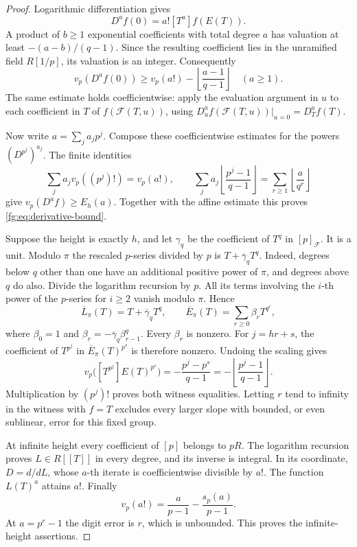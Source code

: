\begin{proof}
Logarithmic differentiation gives
\[
 D^af(0)=a![T^a]f(E(T)).
\]
A product of $b\ge1$ exponential coefficients with total degree $a$
has valuation at least $-(a-b)/(q-1)$. Since the resulting coefficient
lies in the unramified field $R[1/p]$, its valuation is an integer.
Consequently
\[
 v_p(D^af(0))\ge
 v_p(a!)-\left\lfloor\frac{a-1}{q-1}\right\rfloor
 \quad(a\ge1).
\]
The same estimate holds coefficientwise: apply the evaluation argument
in $u$ to each coefficient in $T$ of $f(\mathcal F(T,u))$, using
$D_u^a f(\mathcal F(T,u))|_{u=0}=D_T^af(T)$.

Now write $a=\sum_j a_jp^j$. Compose these coefficientwise estimates
for the powers $(D^{p^j})^{a_j}$. The finite identities
\[
 \sum_j a_jv_p((p^j)!)=v_p(a!),\qquad
 \sum_j a_j\left\lfloor\frac{p^j-1}{q-1}\right\rfloor
       =\sum_{r\ge1}\left\lfloor\frac a{q^r}\right\rfloor
\]
give $v_p(D^af)\ge E_h(a)$. Together with the affine estimate this
proves \eqref{fg:eq:derivative-bound}.

Suppose the height is exactly $h$, and let $\gamma_q$ be the coefficient
of $T^q$ in $[p]_{\mathcal F}$. It is a unit. Modulo $\pi$ the rescaled
$p$-series divided by $p$ is $T+\overline\gamma_qT^q$.
Indeed, degrees below $q$ other than one have an additional positive
power of $\pi$, and degrees above $q$ do also. Divide the logarithm
recursion by $p$. All its terms involving the $i$-th power of the
$p$-series for $i\ge2$ vanish modulo $\pi$. Hence
\[
 \overline L_\pi(T)=T+\overline\gamma_qT^q,\qquad
 \overline E_\pi(T)=\sum_{r\ge0}\beta_rT^{q^r},
\]
where $\beta_0=1$ and $\beta_r=-\overline\gamma_q\beta_{r-1}^q$.
Every $\beta_r$ is nonzero. For $j=hr+s$, the coefficient of $T^{p^j}$
in $\overline E_\pi(T)^{p^s}$ is therefore nonzero. Undoing the scaling
gives
\[
 v_p\bigl([T^{p^j}]E(T)^{p^s}\bigr)
 =-\frac{p^j-p^s}{q-1}
 =-\left\lfloor\frac{p^j-1}{q-1}\right\rfloor.
\]
Multiplication by $(p^j)!$ proves both witness equalities. Letting
$r$ tend to infinity in the witness with $f=T$ excludes every larger
slope with bounded, or even sublinear, error for this fixed group.

At infinite height every coefficient of $[p]$ belongs to $pR$.
The logarithm recursion proves $L\in R[[T]]$ in every degree, and
its inverse is integral. In its coordinate, $D=d/dL$, whose $a$-th
iterate is coefficientwise divisible by $a!$. The function $L(T)^a$
attains $a!$. Finally
\[
 v_p(a!)=\frac a{p-1}-\frac{s_p(a)}{p-1}.
\]
At $a=p^r-1$ the digit error is $r$, which is unbounded. This proves
the infinite-height assertions.
\end{proof}

